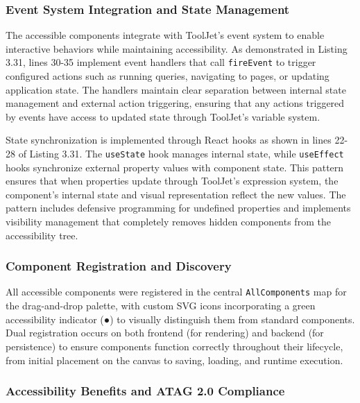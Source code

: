 \subsubsection{Event System Integration and State Management}

The accessible components integrate with ToolJet's event system to enable interactive behaviors while maintaining accessibility. As demonstrated in Listing 3.31, lines 30-35 implement event handlers that call \texttt{fireEvent} to trigger configured actions such as running queries, navigating to pages, or updating application state. The handlers maintain clear separation between internal state management and external action triggering, ensuring that any actions triggered by events have access to updated state through ToolJet's variable system.

State synchronization is implemented through React hooks as shown in lines 22-28 of Listing 3.31. The \texttt{useState} hook manages internal state, while \texttt{useEffect} hooks synchronize external property values with component state. This pattern ensures that when properties update through ToolJet's expression system, the component's internal state and visual representation reflect the new values. The pattern includes defensive programming for undefined properties and implements visibility management that completely removes hidden components from the accessibility tree.

\subsubsection{Component Registration and Discovery}

All accessible components were registered in the central \texttt{AllComponents} map for the drag-and-drop palette, with custom SVG icons incorporating a green accessibility indicator (●) to visually distinguish them from standard components. Dual registration occurs on both frontend (for rendering) and backend (for persistence) to ensure components function correctly throughout their lifecycle, from initial placement on the canvas to saving, loading, and runtime execution.

\subsubsection{Accessibility Benefits and ATAG 2.0 Compliance}

